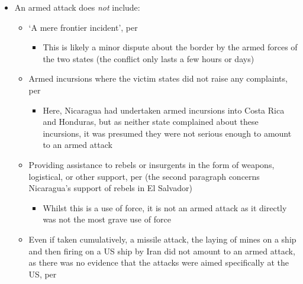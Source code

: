 \begin{itemize}
    \item An armed attack does \textit{not} include:
    \begin{itemize}
        \item `A mere frontier incident', per 
        \begin{itemize}
            \item This is likely a minor dispute about the border by the armed forces of the two states (the conflict only lasts a few hours or days)
        \end{itemize}
        \item Armed incursions where the victim states did not raise any complaints, per 
        \begin{itemize}
            \item Here, Nicaragua had undertaken armed incursions into Costa Rica and Honduras, but as neither state complained about these incursions, it was presumed they were not serious enough to amount to an armed attack
        \end{itemize}
        \item Providing assistance to rebels or insurgents in the form of weapons, logistical, or other support, per  (the second paragraph concerns Nicaragua's support of rebels in El Salvador)
        \begin{itemize}
            \item Whilst this is a use of force, it is not an armed attack as it directly was not the most grave use of force 
        \end{itemize}
        \item Even if taken cumulatively, a missile attack, the laying of mines on a ship and then firing on a US ship by Iran did not amount to an armed attack, as there was no evidence that the attacks were aimed specifically at the US, per 
    \end{itemize}
\end{itemize}

